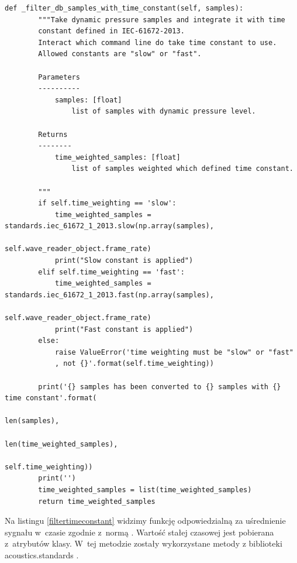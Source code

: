 \documentclass[eng,printmode]{mgr}
\begin{document}
\begin{minipage}{\linewidth}
\begin{lstlisting}[caption={Fragment kodu źródłowego pliku SampledBConverter.py,\newline klasa SamplesDbFSConverter,\newline metoda \_filter\_db\_samples\_with\_time\_constant},captionpos=b,label={filtertimeconstant}]
    def _filter_db_samples_with_time_constant(self, samples):
        """Take dynamic pressure samples and integrate it with time
        constant defined in IEC-61672-2013.
        Interact which command line do take time constant to use.
        Allowed constants are "slow" or "fast".

        Parameters
        ----------
            samples: [float]
                list of samples with dynamic pressure level.

        Returns
        --------
            time_weighted_samples: [float]
                list of samples weighted which defined time constant.

        """
        if self.time_weighting == 'slow':
            time_weighted_samples = standards.iec_61672_1_2013.slow(np.array(samples),
                                                            self.wave_reader_object.frame_rate)
            print("Slow constant is applied")
        elif self.time_weighting == 'fast':
            time_weighted_samples = standards.iec_61672_1_2013.fast(np.array(samples),
                                                            self.wave_reader_object.frame_rate)
            print("Fast constant is applied")
        else:
            raise ValueError('time weighting must be "slow" or "fast"
            , not {}'.format(self.time_weighting))

        print('{} samples has been converted to {} samples with {} time constant'.format(
        															len(samples),
                                                                    len(time_weighted_samples),
                                                                    self.time_weighting))
        print('')
        time_weighted_samples = list(time_weighted_samples)
        return time_weighted_samples
\end{lstlisting}
\end{minipage}

Na listingu \ref{filtertimeconstant} widzimy funkcję odpowiedzialną za uśrednienie sygnału w~czasie zgodnie z~normą  \cite{IEC-61672-2013}. Wartość stałej czasowej jest pobierana z~atrybutów klasy. W~tej metodzie zostały wykorzystane metody z biblioteki acoustics.standards \cite{acoustics}.
\end{document}
